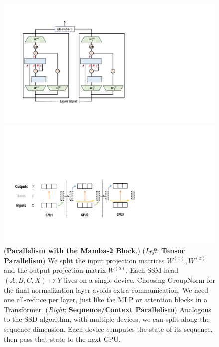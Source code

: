 \begin{figure}[!t]
\centering
\begin{minipage}{.4\linewidth}%
  \centering
  \includegraphics[width=\linewidth]{fig/mamba_tp.pdf}
\end{minipage}
\hfill
\begin{minipage}{.59\linewidth}%
  \centering
  \includegraphics[width=\linewidth]{fig/mamba_cp.pdf}
\end{minipage}
\caption{
  (\textbf{Parallelism with the Mamba-2 Block}.)
  (\emph{Left}: \textbf{Tensor Parallelism})
  We split the input projection matrices $W^{(x)}, W^{(z)}$ and the output projection matrix $W^{(o)}$.
  Each SSM head $(A, B, C, X) \mapsto Y$ lives on a single device.
  Choosing GroupNorm for the final normalization layer avoids extra communication.
  We need one all-reduce per layer, just like the MLP or attention blocks in a Transformer.
  (\emph{Right}: \textbf{Sequence/Context Parallelism})
  Analogous to the SSD algorithm, with multiple devices, we can split along the sequence dimension. Each device computes the state of its sequence, then pass that state to the next GPU.
}
\label{fig:mamba2_parallelism}
\end{figure}

